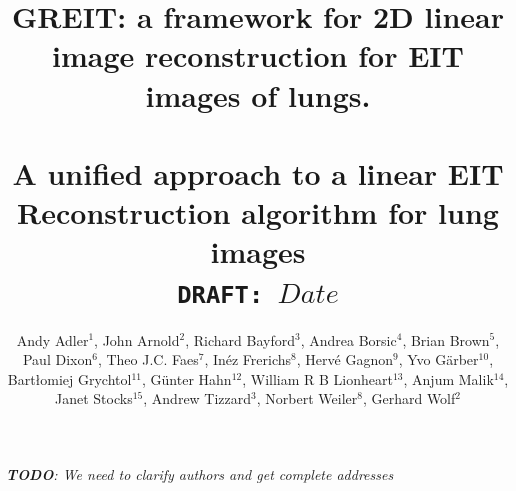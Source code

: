 \documentclass[12pt]{iopart}
\begin{document}
\title[GREIT: framework for linear image reconstruction]{%
GREIT: a framework for 2D linear image reconstruction for
       EIT images of lungs.
\\
\hspace{3cm}{\em or } \\
A unified approach to a linear EIT Reconstruction algorithm
       for lung images
\\
{\small \tt DRAFT: $Date$}
}

\author{Andy Adler$^{1}$,
        John Arnold$^{2}$,
        Richard Bayford$^{3}$,
        Andrea Borsic$^{4}$,
        Brian Brown$^{5}$,
        Paul Dixon$^{6}$,
        Theo J.C. Faes$^{7}$,
        In\'ez Frerichs$^{8}$,
        Herv\'e Gagnon$^{9}$,
        Yvo G\"arber$^{10}$,
        Bart\l{}omiej Grychtol$^{11}$, 
        G\"unter Hahn$^{12}$,
        William R B Lionheart$^{13}$,
        Anjum Malik$^{14}$,
        Janet Stocks$^{15}$,
        Andrew Tizzard$^{3}$,
        Norbert Weiler$^{8}$,
        Gerhard Wolf$^{2}$%
       }

{\em {\bf TODO}: We need to clarify authors and get complete addresses}
\address{ $^{1}$Systems and Computer Engineering,
                Carleton University, Ottawa, Canada}
\address{ $^{2}$Division of Critical Care Medicine, Department of Anesthesia,
                Children's Hospital Boston, Harvard Medical School, Boston, MA, USA}
\address{ $^{3}$Middlesex University, London, UK}
\address{ $^{4}$School of Engineering, 
                Dartmouth College, Hanover, NH, USA}
\address{ $^{5}$University of Sheffield, UK}
\address{ $^{6}$Cardinal Health Care, London, UK}
\address{ $^{7}$V.U. university medical center, Amsterdam, Netherlands}
\address{ $^{8}$University of Kiel, Germany}
\address{ $^{9}$\'Ecole Polytechnique de Montr\'eal, Canada}
\address{$^{10}$Dr\"ager Medical, L\"ubeck, Germany}
\address{$^{11}$University of Strathclyde, Glasgow, UK}
\address{$^{12}$University of G\"ottingen, Germany}
\address{$^{13}$University of Manchester, UK}
\address{$^{14}$Maltron International, Rayleigh, UK}
\address{$^{15}$Institute of Child Health, UCL, London, UK}
\end{document}
